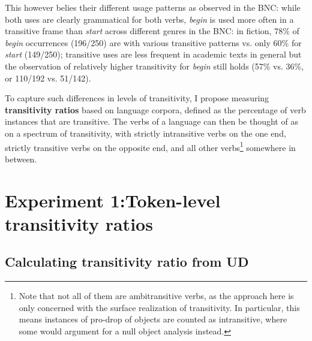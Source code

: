 \begin{exe}
\ex\label{example-begin_start}
  \begin{xlist}
  \end{xlist}
\end{exe}

This however belies their different usage patterns as observed in the BNC: while both uses are clearly grammatical for both verbs, \textit{begin} is used more often in a transitive frame than \textit{start} across different genres in the BNC: in fiction, 78\% of \textit{begin} occurrences (196/250) are with various transitive patterns vs. only 60\% for \textit{start} (149/250); transitive uses are less frequent in academic texts in general but the observation of relatively higher transitivity for \textit{begin} still holds (57\% vs. 36\%, or 110/192 vs. 51/142).

To capture such differences in levels of transitivity, I propose measuring \textbf{transitivity ratios} based on language corpora, defined as the percentage of verb instances that are transitive. The verbs of a language can then be thought of as on a spectrum of transitivity, with strictly intransitive verbs on the one end, strictly transitive verbs on the opposite end, and all other verbs\footnote{Note that not all of them are ambitransitive verbs, as the approach here is only concerned with the surface realization of transitivity. In particular, this means instances of pro-drop of objects are counted as intransitive, where some would argument for a null object analysis instead.} somewhere in between.

\section{Experiment 1:Token-level transitivity ratios}\label{sec:exp1}
\subsection{Calculating transitivity ratio from UD}

